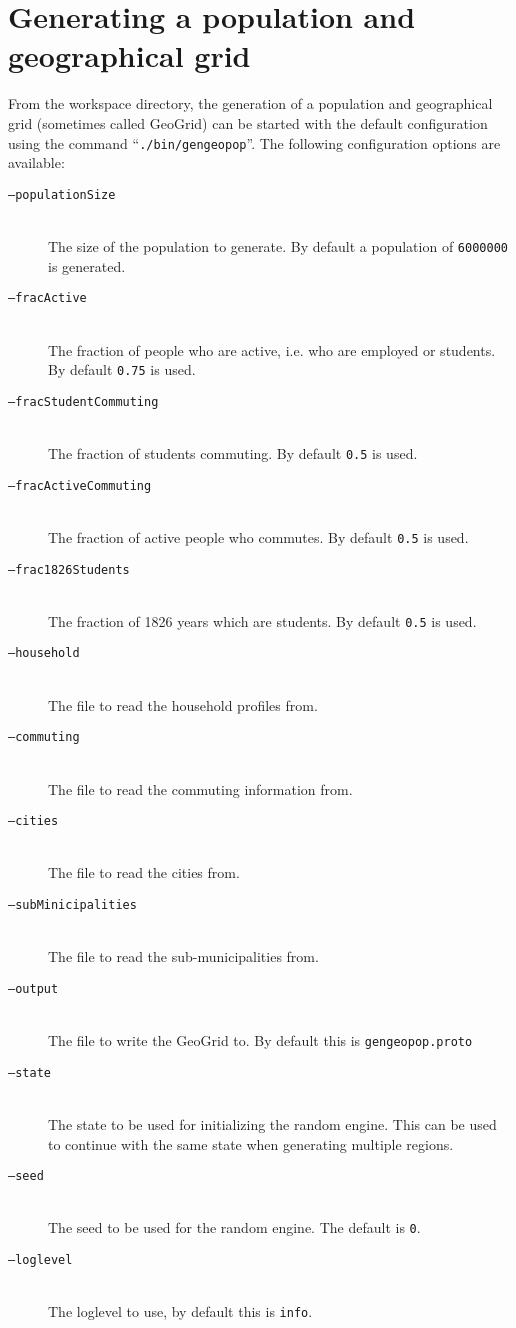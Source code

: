 \section{Generating a population and geographical grid}


From the workspace directory, the generation of a population and geographical grid (sometimes called GeoGrid) can be started with the default configuration using the command \mbox{``\texttt{./bin/gengeopop}''}. The following configuration options are available:

\begin{description}
    \item[\texttt{--populationSize}] \ \\
        The size of the population to generate. By default a population of \texttt{6000000} is generated.
    \item[\texttt{--fracActive}] \ \\
        The fraction of people who are active, i.e. who are employed or students. By default \texttt{0.75} is used.
    \item[\texttt{--fracStudentCommuting}] \ \\
        The fraction of students commuting. By default \texttt{0.5} is used.
    \item[\texttt{--fracActiveCommuting}] \ \\
        The fraction of active people who commutes. By default \texttt{0.5} is used.
    \item[\texttt{--frac1826Students}] \ \\
        The fraction of 1826 years which are students. By default \texttt{0.5} is used.
    \item[\texttt{--household}] \ \\
        The file to read the household profiles from.
    \item[\texttt{--commuting}] \ \\
        The file to read the commuting information from.
    \item[\texttt{--cities}] \ \\
        The file to read the cities from.
    \item[\texttt{--subMinicipalities}] \ \\
        The file to read the sub-municipalities from.
    \item[\texttt{--output}] \ \\
        The file to write the GeoGrid to. By default this is \texttt{gengeopop.proto}
    \item[\texttt{--state}] \ \\
        The state to be used for initializing the random engine. This can be used to continue with the same state when generating multiple regions.
    \item[\texttt{--seed}] \ \\
        The seed to be used for the random engine. The default is \texttt{0}.
    \item[\texttt{--loglevel}] \ \\
        The loglevel to use, by default this is \texttt{info}.
\end{description}


